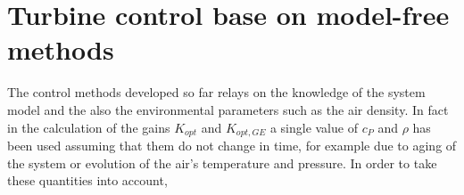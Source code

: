 \section{Turbine control base on model-free methods}\label{sec:control_P_GE}
The control methods developed so far relays on the knowledge of the system model and the also the environmental parameters such as the air density. In fact in the calculation of the gains $K_{opt}$ and $K_{opt,GE}$ a single value of $c_P$ and $\rho$ has been used assuming that them do not change in time, for example due to aging of the system or evolution of the air's temperature and pressure. In order to take these quantities into account,  

